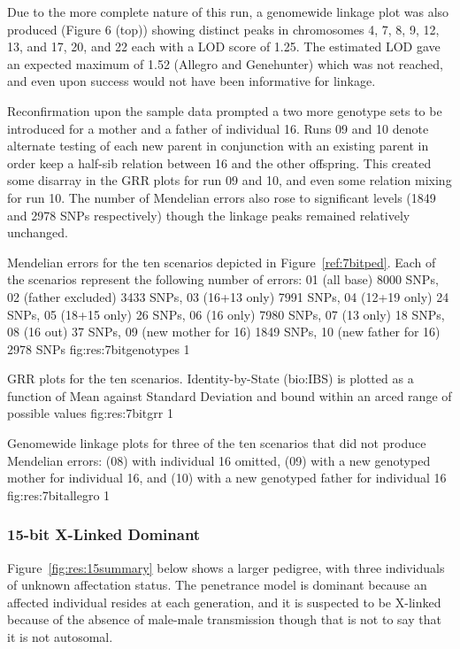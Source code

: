 Due to the more complete nature of this run, a genomewide linkage plot was also produced (Figure 6 (top)) showing distinct peaks in chromosomes 4, 7, 8, 9, 12, 13, and 17, 20, and 22 each with a LOD score of 1.25. The estimated LOD gave an expected maximum of 1.52 (Allegro and Genehunter) which was not reached, and even upon success would not have been informative for linkage.

Reconfirmation upon the sample data prompted a two more genotype sets to be introduced for a mother and a father of individual 16. Runs 09 and 10 denote alternate testing of each new parent in conjunction with an existing parent in order keep a half-sib relation between 16 and the other offspring.
This created some disarray in the GRR plots for run 09 and 10, and even some relation mixing for run 10. The number of Mendelian errors also rose to significant levels (1849 and 2978 SNPs respectively) though the linkage peaks remained relatively unchanged.

{Mendelian errors for the ten scenarios depicted in Figure~\ref{ref:7bitped}. Each of the scenarios represent the following number of errors: 01 (all base) 8000 SNPs, 02 (father excluded) 3433 SNPs, 03 (16+13 only) 7991 SNPs, 04 (12+19 only) 24 SNPs, 05 (18+15 only) 26 SNPs, 06 (16 only) 7980 SNPs, 07 (13 only) 18 SNPs, 08 (16 out) 37 SNPs, 09 (new mother for 16) 1849 SNPs, 10 (new father for 16) 2978 SNPs}
{fig:res:7bitgenotypes}
{1}

{GRR plots for the ten scenarios. Identity-by-State (\gls{bio:IBS}) is plotted as a function of Mean against Standard Deviation and bound within an arced range of possible values}
{fig:res:7bitgrr}
{1}

{Genomewide linkage plots for three of the ten scenarios that did not produce Mendelian errors: (08) with individual 16 omitted, (09) with a new genotyped mother for individual 16, and (10) with a new genotyped father for individual 16}
{fig:res:7bitallegro}
{1}


\subsubsection*{15-bit X-Linked Dominant}

Figure~\ref{fig:res:15summary} below shows a larger pedigree, with three individuals of unknown affectation status.  The penetrance model is dominant because an affected individual resides at each generation, and it is suspected to be X-linked because of the absence of male-male transmission though that is not to say that it is not autosomal.

